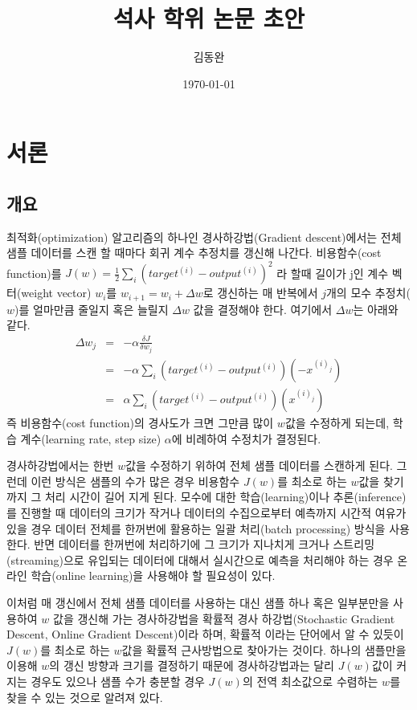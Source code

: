 \documentclass[oneside,b5paper,11pt]{book} %
\title{석사 학위 논문 초안}
\author{김동완}
\date{\today}
\begin{document}
\maketitle

\tableofcontents

\chapter{서론}

\section{개요}
최적화(optimization) 알고리즘의 하나인 경사하강법(Gradient descent)에서는 전체 샘플 데이터를 스캔 할 때마다 회귀 계수 추정치를 갱신해 나간다. 비용함수(cost function)를 $J(w) = \frac{1}{2} \sum_{i}(target^{(i)} - output^{(i)})^{2}$ 라 할때 길이가 j인 계수 벡터(weight vector) $w_i$를 $w_{i+1}=w_{i}+\Delta w$로 갱신하는 매 반복에서 $j$개의 모수 추정치($w$)를 얼마만큼 줄일지 혹은 늘릴지 $\Delta w$ 값을 결정해야 한다. 여기에서 $\Delta w$는 아래와 같다.
\begin{eqnarray}
\Delta w_{j} 	&=& -\alpha \frac{\delta J}{\delta w_{j}} \\
							&=& -\alpha \sum_{i}(target^{(i)} - output^{(i)})(-x^{(i)_{j}}) \\
							&=& \alpha \sum_{i}(target^{(i)} - output^{(i)})(x^{(i)_{j}})
\end{eqnarray}
즉 비용함수(cost function)의 경사도가 크면 그만큼 많이 $w$값을 수정하게 되는데, 학습 계수(learning rate, step size) $\alpha$에 비례하여 수정치가 결정된다.

 경사하강법에서는 한번 $w$값을 수정하기 위하여 전체 샘플 데이터를 스캔하게 된다. 그런데 이런 방식은 샘플의 수가 많은 경우 
비용함수 $J(w)$를 최소로 하는 $w$값을 찾기 까지 그 처리 시간이 길어 지게 된다. 모수에 대한 학습(learning)이나 추론(inference)를 진행할 때 데이터의 크기가 작거나 데이터의 수집으로부터 예측까지 시간적 여유가 있을 경우 데이터 전체를 한꺼번에 활용하는 일괄 처리(batch processing) 방식을 사용한다. 반면 데이터를 한꺼번에 처리하기에 그 크기가 지나치게 크거나 스트리밍(streaming)으로 유입되는 데이터에 대해서 실시간으로 예측을 처리해야 하는 경우 온라인 학습(online learning)을 사용해야 할 필요성이 있다.

 이처럼 매 갱신에서 전체 샘플 데이터를 사용하는 대신 샘플 하나 혹은 일부분만을 사용하여 $w$ 값을 갱신해 가는 경사하강법을 확률적 경사 하강법(Stochastic Gradient Descent, Online Gradient Descent)이라 하며, 확률적 이라는 단어에서 알 수 있듯이 $J(w)$를 최소로 하는 $w$값을 확률적 근사방법으로 찾아가는 것이다. 하나의 샘플만을 이용해 $w$의 갱신 방향과 크기를 결정하기 때문에 경사하강법과는 달리 $J(w)$값이 커지는 경우도 있으나 샘플 수가 충분할 경우 $J(w)$의 전역 최소값으로 수렴하는 $w$를 찾을 수 있는 것으로 알려져 있다. \citep{Bottou2010}
\end{document}
